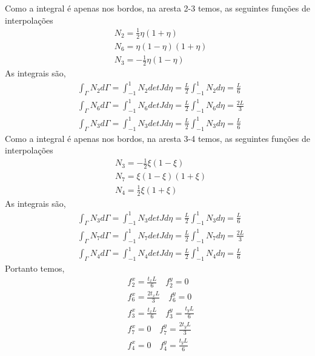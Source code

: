 %
Como a integral é apenas nos bordos, na aresta 2-3 temos, as seguintes funções de interpolações 
%
\begin{equation}
	\begin{split}
		&N_2 = \frac{1}{2} \eta (1 + \eta) \\ 
		&N_6 = \eta (1 - \eta) (1 + \eta) \\ 
		&N_3 = -\frac{1}{2} \eta (1 - \eta)  
	\end{split}
\end{equation}
%
As integrais são,
\begin{equation}
	\begin{split}
		&\int_{\Gamma} N_2 d\Gamma = \int_{-1}^{1} N_2 det J d\eta = \frac{L}{2} \int_{-1}^{1} N_2 d\eta =  \frac{L}{6}\\
		&\int_{\Gamma} N_6 d\Gamma = \int_{-1}^{1} N_6 det J d\eta = \frac{L}{2} \int_{-1}^{1} N_6 d\eta =  \frac{2 L}{3}\\
		&\int_{\Gamma} N_3 d\Gamma = \int_{-1}^{1} N_3 det J d\eta = \frac{L}{2} \int_{-1}^{1} N_3 d\eta =  \frac{L}{6}
	\end{split}
\end{equation}
Como a integral é apenas nos bordos, na aresta 3-4 temos, as seguintes funções de interpolações 
%
\begin{equation}
	\begin{split}
		&N_3 = -\frac{1}{2} \xi (1 - \xi) \\ 
		&N_7 = \xi (1 - \xi) (1 + \xi) \\ 
		&N_4 = \frac{1}{2} \xi (1 + \xi)  
	\end{split}
\end{equation}
%
As integrais são,
\begin{equation}
	\begin{split}
		&\int_{\Gamma} N_3 d\Gamma = \int_{-1}^{1} N_3 det J d\eta = \frac{L}{2} \int_{-1}^{1} N_3 d\eta =  \frac{L}{6}\\
		&\int_{\Gamma} N_7 d\Gamma = \int_{-1}^{1} N_7 det J d\eta = \frac{L}{2} \int_{-1}^{1} N_7 d\eta =  \frac{2 L}{3}\\
		&\int_{\Gamma} N_4 d\Gamma = \int_{-1}^{1} N_4 det J d\eta = \frac{L}{2} \int_{-1}^{1} N_4 d\eta =  \frac{L}{6}
	\end{split}
\end{equation}
%
Portanto temos,
%
\begin{equation}
	\begin{split}
		&f^x_2 = \frac{t_x L}{6} \quad f^y_2 = 0\\
		&f^x_6 = \frac{2 t_x L}{3} \quad f^y_6 = 0\\
		&f^x_3 = \frac{t_x L}{6} \quad f^y_3 = \frac{t_y L}{6}\\
		&f^x_7 = 0 \quad f^y_7 = \frac{2 t_y L}{3}\\
		&f^x_4 = 0 \quad f^y_4 = \frac{t_y L}{6}
	\end{split}
\end{equation}
